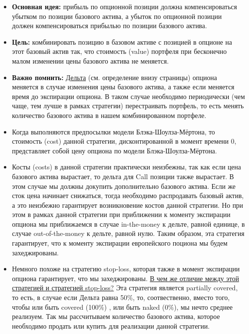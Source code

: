\documentclass{article}
\begin{document}
\begin{itemize}
	\item \textbf{Основная идея:} прибыль по опционной позиции должна компенсироваться убытком по позиции базового актива, а убыток по опционной позиции должен компенсироваться прибылью по позиции базового актива.
	
	\item \textbf{Цель:} комбинировать позицию в базовом активе с позицией в опционе на этот базовый актив так, что стоимость (value) портфеля при бесконечно малом изменении цены базового актива не меняется.
	
	\item \textbf{Важно помнить:} \hyperlink{pdf}{Дельта} (см. определение внизу страницы) опциона меняется в случае изменения цены базового актива, а также если меняется время до экспирации опциона. В таком случае необходимо периодически (чем чаще,  тем лучше в рамках стратегии) перестраивать портфель, то есть менять количество базового актива в нашем комбинированном портфеле.
	
	\item Когда выполняются предпосылки модели Блэка-Шоулза-Мёртона, то стоимость (cost) данной стратегии, дисконтированной в момент времени 0, представляет собой цену опциона по модели Блэка-Шоулза-Мёртона.
	
	\item Косты (costs) в данной стратегии практически неизбежны, так как если цена базового актива вырастает, то дельта для Call позиции также вырастает. В этом случае мы должны докупить дополнительно базового актива. Если же сток цена начинает снижаться, тогда необходимо распродавать базовый актив, а это неизбежно гарантирует возникновение костов данной стратегии.  Но при этом в рамках данной стратегии при приближении к моменту экспирации опциона мы приближаемся в случае in-the-money к дельте, равной единице, в случае out-of-the-money к дельте, равной нулю. Таким образом, эта стратегия гарантирует, что к моменту экспирации европейского поциона мы будем захеджированы.
	
	\item Немного похоже на стратегию stop-loss, которая также в момент экспирации опциона гарантирует, что мы захеджированы. \underline{В чем же отличие между этой стратегией и стратегией stop-loss?} Эта стратегия является partially covered, то есть, в случае если Дельта равна 50\%, то, соотвественно, вместо того, чтобы или быть covered (100\%) , или быть naked (0\%), мы нечто среднее реализуем. Так мы рассчитываем количество базового актива, которое необходимо продать или купить для реализации данной стратегии.
	

\end{itemize}
\end{document}
